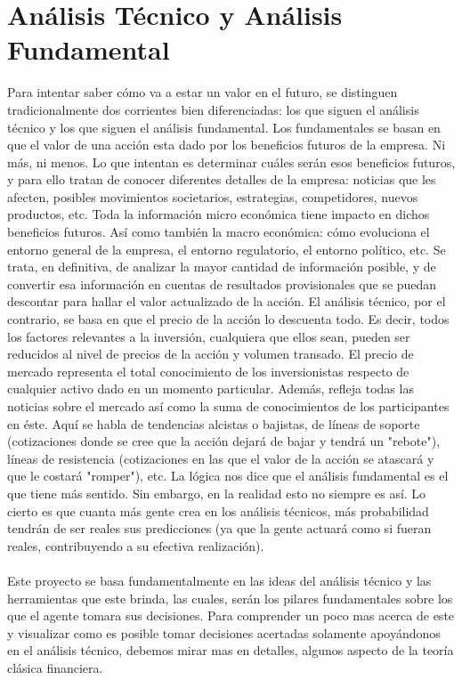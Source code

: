 \section{Análisis Técnico y Análisis Fundamental}
Para intentar saber cómo va a estar un valor en el futuro, se distinguen tradicionalmente dos corrientes bien diferenciadas: los que siguen el análisis técnico y los que siguen el análisis fundamental. Los fundamentales se basan en que el valor de una acción esta dado por los beneficios futuros de la empresa. Ni más, ni menos. Lo que intentan es determinar cuáles serán esos beneficios futuros, y para ello tratan de conocer diferentes detalles de la empresa: noticias que les afecten, posibles movimientos societarios, estrategias, competidores, nuevos productos, etc. Toda la información micro económica tiene impacto en dichos beneficios futuros. Así como también la macro económica: cómo evoluciona el entorno general de la empresa, el entorno regulatorio, el entorno político, etc. Se trata, en definitiva, de analizar la mayor cantidad de información posible, y de convertir esa información en cuentas de resultados provisionales que se puedan descontar para hallar el valor actualizado de la acción. 
El análisis técnico, por el contrario, se basa en que el precio de la acción lo descuenta todo. Es decir, todos los factores relevantes a la inversión, cualquiera que ellos sean, pueden ser reducidos al nivel de precios de la acción y volumen transado. El precio de mercado representa el total conocimiento de los inversionistas respecto de cualquier activo dado en un momento particular. Además, refleja todas las noticias sobre el mercado así como la suma de conocimientos de los participantes en éste.  Aquí se habla de tendencias alcistas o bajistas, de líneas de soporte (cotizaciones donde se cree que la acción dejará de bajar y tendrá un "rebote"), líneas de resistencia (cotizaciones en las que el valor de la acción se atascará y que le costará "romper"), etc. 
La lógica nos dice que el análisis fundamental es el que tiene más sentido. Sin embargo, en la realidad esto no siempre es así. Lo cierto es que cuanta más gente crea en los análisis técnicos, más probabilidad tendrán de ser reales sus predicciones (ya que la gente actuará como si fueran reales, contribuyendo a su efectiva realización).
\\\\
Este proyecto se basa fundamentalmente en las ideas del análisis técnico y las herramientas que este brinda, las cuales, serán los pilares fundamentales sobre los que el agente tomara sus decisiones.
Para comprender un poco mas acerca de este y visualizar como es posible tomar decisiones acertadas solamente apoyándonos en el análisis técnico, debemos mirar mas en detalles, algunos aspecto de la teoría clásica financiera.

